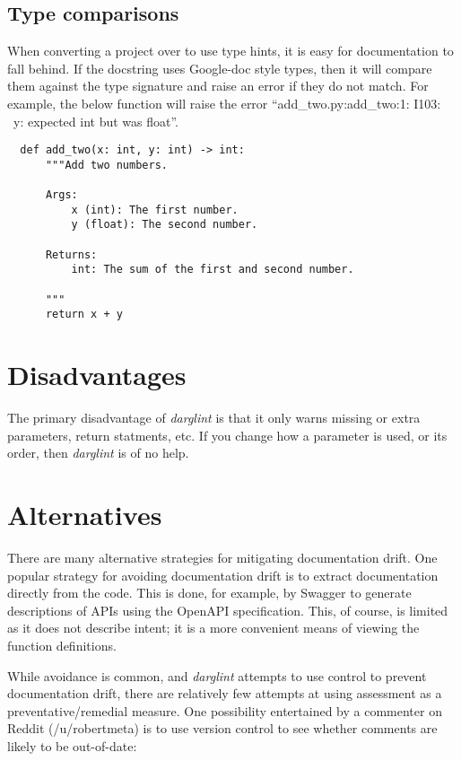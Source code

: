 \documentclass[landscape]{sciposter}
\begin{document}
\begin{multicols}{4}
        \subsection{Type comparisons}
            When converting a project over to use type hints, it is easy
            for documentation to fall behind.  If the docstring uses Google-doc
            style types, then it will compare them against the type signature
            and raise an error if they do not match. For example, the below
            function will raise the error ``add\_two.py:add\_two:1: I103: ~y:
            expected int but was float''.

\begin{verbatim}
  def add_two(x: int, y: int) -> int:
      """Add two numbers.

      Args:
          x (int): The first number.
          y (float): The second number.

      Returns:
          int: The sum of the first and second number.

      """
      return x + y
\end{verbatim}

    \section{Disadvantages}
        The primary disadvantage of \textit{darglint} is that it only warns
        missing or extra parameters, return statments, etc.  If you change how
        a parameter is used, or its order, then \textit{darglint} is of no help.

    \section{Alternatives}
        There are many alternative strategies for mitigating documentation
        drift.  One popular strategy for avoiding documentation drift is
        to extract documentation directly from the code.  This is done,
        for example, by Swagger to generate descriptions of APIs using
        the OpenAPI specification.  This, of course, is limited as it does
        not describe intent; it is a more convenient means of viewing the
        function definitions.

        While avoidance is common, and \textit{darglint} attempts to use control
        to prevent documentation drift, there are relatively few attempts
        at using assessment as a preventative/remedial measure.  One possibility
        entertained by a commenter on Reddit (/u/robertmeta) is to use
        version control to see whether comments are likely to be out-of-date:


\end{multicols}
\end{document}
